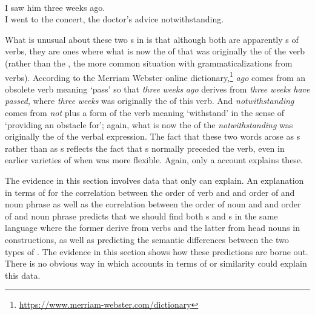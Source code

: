\documentclass[output=paper]{langsci/langscibook}
\begin{document}
\ea\label{ex:dryer:36}
\\
\ea  I saw him three weeks ago.\\
\ex  I went to the concert, the doctor’s advice notwithstanding.\\
\z
\z

\noindent What is unusual about these two s in  is that although both are apparently s of verbs, they are ones where what is now the  of that  was originally the  of the verb (rather than the , the more common situation with grammaticalizations from verbs). According to the Merriam Webster online dictionary,\footnote{\url{https://www.merriam-webster.com/dictionary}} \textit{ago} comes from an obsolete verb meaning ‘pass’ so that \textit{three} \textit{weeks} \textit{ago}  derives from \textit{three} \textit{weeks} \textit{have} \textit{passed}, where \textit{three} \textit{weeks} was originally the  of this verb. And \textit{notwithstanding} comes from \textit{not} plus a form of the verb meaning ‘withstand’ in the sense of ‘providing an obstacle for’; again, what is now the  of the  \textit{notwithstanding} was originally the  of the verbal expression. The fact that these two words arose as s rather than as s reflects the fact that s normally preceded the verb, even in earlier varieties of  when  was more flexible. Again, only a  account explains these.

The evidence in this section involves data that only  can explain. An explanation in terms of  for the correlation between the order of verb and  and order of  and noun phrase as well as the correlation between the order of noun and  and order of  and noun phrase predicts that we should find both s and s in the same language where the former derive from verbs and the latter from head nouns in  constructions, as well as predicting the semantic differences between the two types of . The evidence in this section shows how these predictions are borne out. There is no obvious way in which accounts in terms of  or similarity could explain this data.
\end{document}
